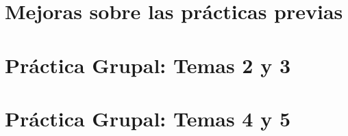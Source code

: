 \documentclass[print, color]{ugrTFG}
\begin{document}

\maketitle

\frontmatter




\mainmatter

\part{Mejoras sobre las prácticas previas}



\part{Práctica Grupal: Temas 2 y 3}





\part{Práctica Grupal: Temas 4 y 5}




\end{document}
